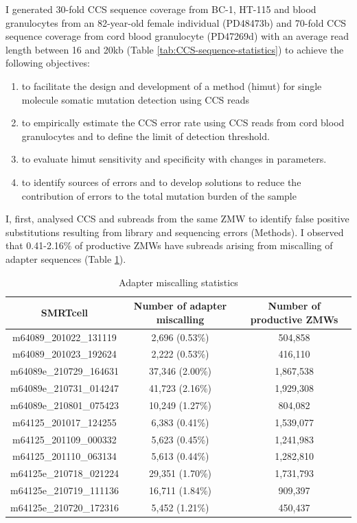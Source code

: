 I generated 30-fold CCS sequence coverage from BC-1, HT-115 and blood granulocytes from an 82-year-old female individual (PD48473b) and 70-fold CCS sequence coverage from cord blood granulocyte (PD47269d) with an average read length between 16 and 20kb (Table \ref{tab:CCS-sequence-statistics}) to achieve the following objectives: 

\begin{enumerate}
\item to facilitate the design and development of a method (himut) for single molecule somatic mutation detection using CCS reads 
\item to empirically estimate the CCS error rate using CCS reads from cord blood granulocytes and to define the limit of detection threshold.
\item to evaluate himut sensitivity and specificity with changes in parameters.
\item to identify sources of errors and to develop solutions to reduce the contribution of errors to the total mutation burden of the sample
\end{enumerate}

I, first, analysed CCS and subreads from the same ZMW to identify false positive substitutions resulting from library and sequencing errors (Methods). I observed that 0.41-2.16\% of productive ZMWs have subreads arising from miscalling of adapter sequences (Table \ref{tab:adapter-miscalling-statistics}).

\begin{table}[htbp!]
\caption{Adapter miscalling statistics}
\label{tab:adapter-miscalling-statistics}
\begin{tabular}{c|c|c}
SMRTcell & Number of adapter miscalling & Number of productive ZMWs \\ \hline
m64089\_201022\_131119 & 2,696 (0.53\%) & 504,858 \\ \hline
m64089\_201023\_192624 & 2,222 (0.53\%) & 416,110 \\ \hline
m64089e\_210729\_164631 & 37,346 (2.00\%) & 1,867,538 \\ \hline
m64089e\_210731\_014247 & 41,723 (2.16\%) & 1,929,308 \\ \hline
m64089e\_210801\_075423 & 10,249 (1.27\%) & 804,082 \\ \hline
m64125\_201017\_124255 & 6,383 (0.41\%) & 1,539,077 \\ \hline
m64125\_201109\_000332 & 5,623 (0.45\%) & 1,241,983 \\ \hline
m64125\_201110\_063134 & 5,613 (0.44\%) & 1,282,810 \\ \hline
m64125e\_210718\_021224 & 29,351 (1.70\%) & 1,731,793 \\ \hline
m64125e\_210719\_111136 & 16,711 (1.84\%) & 909,397 \\ \hline
m64125e\_210720\_172316 & 5,452 (1.21\%) & 450,437 \\ \hline
\end{tabular}
\end{table}

